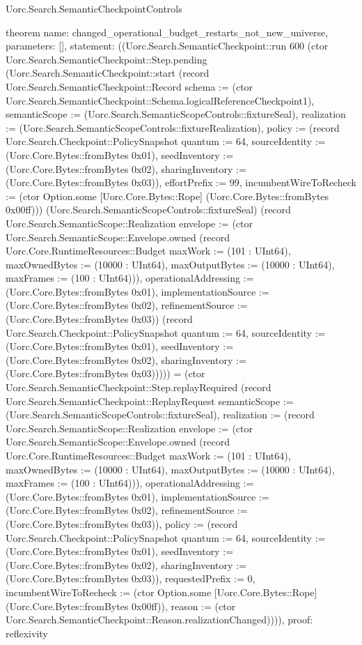 \begin{lexlean}{Uorc.Search.SemanticCheckpointControls}
\begin{semanticmodule}
theorem{
  name: changed_operational_budget_restarts_not_new_universe,
  parameters: [],
  statement: ((Uorc.Search.SemanticCheckpoint::run 600 (ctor Uorc.Search.SemanticCheckpoint::Step.pending (Uorc.Search.SemanticCheckpoint::start (record Uorc.Search.SemanticCheckpoint::Record {schema := (ctor Uorc.Search.SemanticCheckpoint::Schema.logicalReferenceCheckpoint1), semanticScope := (Uorc.Search.SemanticScopeControls::fixtureSeal), realization := (Uorc.Search.SemanticScopeControls::fixtureRealization), policy := (record Uorc.Search.Checkpoint::PolicySnapshot {quantum := 64, sourceIdentity := (Uorc.Core.Bytes::fromBytes 0x01), seedInventory := (Uorc.Core.Bytes::fromBytes 0x02), sharingInventory := (Uorc.Core.Bytes::fromBytes 0x03)}), effortPrefix := 99, incumbentWireToRecheck := (ctor Option.some [Uorc.Core.Bytes::Rope] (Uorc.Core.Bytes::fromBytes 0x00ff))}) (Uorc.Search.SemanticScopeControls::fixtureSeal) (record Uorc.Search.SemanticScope::Realization {envelope := (ctor Uorc.Search.SemanticScope::Envelope.owned (record Uorc.Core.RuntimeResources::Budget {maxWork := (101 : UInt64), maxOwnedBytes := (10000 : UInt64), maxOutputBytes := (10000 : UInt64), maxFrames := (100 : UInt64)})), operationalAddressing := (Uorc.Core.Bytes::fromBytes 0x01), implementationSource := (Uorc.Core.Bytes::fromBytes 0x02), refinementSource := (Uorc.Core.Bytes::fromBytes 0x03)}) (record Uorc.Search.Checkpoint::PolicySnapshot {quantum := 64, sourceIdentity := (Uorc.Core.Bytes::fromBytes 0x01), seedInventory := (Uorc.Core.Bytes::fromBytes 0x02), sharingInventory := (Uorc.Core.Bytes::fromBytes 0x03)})))) = (ctor Uorc.Search.SemanticCheckpoint::Step.replayRequired (record Uorc.Search.SemanticCheckpoint::ReplayRequest {semanticScope := (Uorc.Search.SemanticScopeControls::fixtureSeal), realization := (record Uorc.Search.SemanticScope::Realization {envelope := (ctor Uorc.Search.SemanticScope::Envelope.owned (record Uorc.Core.RuntimeResources::Budget {maxWork := (101 : UInt64), maxOwnedBytes := (10000 : UInt64), maxOutputBytes := (10000 : UInt64), maxFrames := (100 : UInt64)})), operationalAddressing := (Uorc.Core.Bytes::fromBytes 0x01), implementationSource := (Uorc.Core.Bytes::fromBytes 0x02), refinementSource := (Uorc.Core.Bytes::fromBytes 0x03)}), policy := (record Uorc.Search.Checkpoint::PolicySnapshot {quantum := 64, sourceIdentity := (Uorc.Core.Bytes::fromBytes 0x01), seedInventory := (Uorc.Core.Bytes::fromBytes 0x02), sharingInventory := (Uorc.Core.Bytes::fromBytes 0x03)}), requestedPrefix := 0, incumbentWireToRecheck := (ctor Option.some [Uorc.Core.Bytes::Rope] (Uorc.Core.Bytes::fromBytes 0x00ff)), reason := (ctor Uorc.Search.SemanticCheckpoint::Reason.realizationChanged)}))),
  proof: reflexivity{}
}


\end{semanticmodule}
\end{lexlean}
